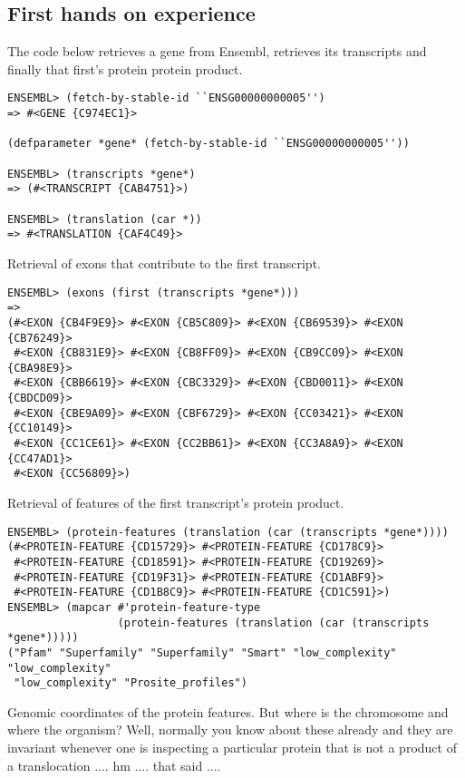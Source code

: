 \documentclass{book}
\begin{document}
\subsection{First hands on experience}
The code below retrieves a gene from Ensembl, retrieves its transcripts and finally 
that first's protein protein product.

\begin{lstlisting}
ENSEMBL> (fetch-by-stable-id ``ENSG00000000005'')
=> #<GENE {C974EC1}>

(defparameter *gene* (fetch-by-stable-id ``ENSG00000000005''))

ENSEMBL> (transcripts *gene*)
=> (#<TRANSCRIPT {CAB4751}>)

ENSEMBL> (translation (car *))
=> #<TRANSLATION {CAF4C49}>
\end{lstlisting}

Retrieval of exons that contribute to the first transcript.
\begin{lstlisting}
ENSEMBL> (exons (first (transcripts *gene*)))
=> 
(#<EXON {CB4F9E9}> #<EXON {CB5C809}> #<EXON {CB69539}> #<EXON {CB76249}>
 #<EXON {CB831E9}> #<EXON {CB8FF09}> #<EXON {CB9CC09}> #<EXON {CBA98E9}>
 #<EXON {CBB6619}> #<EXON {CBC3329}> #<EXON {CBD0011}> #<EXON {CBDCD09}>
 #<EXON {CBE9A09}> #<EXON {CBF6729}> #<EXON {CC03421}> #<EXON {CC10149}>
 #<EXON {CC1CE61}> #<EXON {CC2BB61}> #<EXON {CC3A8A9}> #<EXON {CC47AD1}>
 #<EXON {CC56809}>)
\end{lstlisting}

Retrieval of features of the first transcript's protein product.

\begin{lstlisting}
ENSEMBL> (protein-features (translation (car (transcripts *gene*))))
(#<PROTEIN-FEATURE {CD15729}> #<PROTEIN-FEATURE {CD178C9}>
 #<PROTEIN-FEATURE {CD18591}> #<PROTEIN-FEATURE {CD19269}>
 #<PROTEIN-FEATURE {CD19F31}> #<PROTEIN-FEATURE {CD1ABF9}>
 #<PROTEIN-FEATURE {CD1B8C9}> #<PROTEIN-FEATURE {CD1C591}>)
ENSEMBL> (mapcar #'protein-feature-type
                 (protein-features (translation (car (transcripts *gene*)))))
("Pfam" "Superfamily" "Superfamily" "Smart" "low_complexity" "low_complexity"
 "low_complexity" "Prosite_profiles")
\end{lstlisting}

Genomic coordinates of the protein features. But where is the chromosome
and where the organism? Well, normally you know about these already and they
are invariant whenever one is inspecting a particular protein that is not
a product of a translocation .... hm .... that said ....
\end{document}

